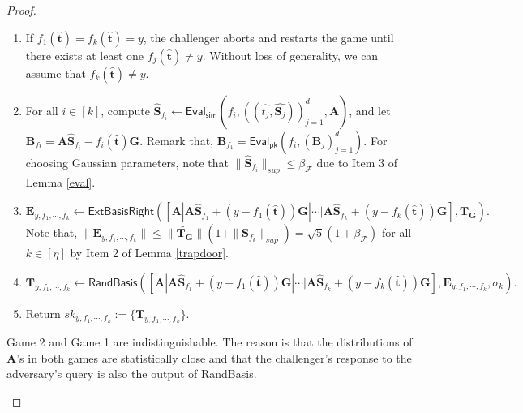 \documentclass[runningheads,10pt]{llncs}
\begin{document}
\begin{proof}
\begin{description}
		\begin{enumerate}
			\item If $f_1(\widehat{\mathbf{t}})=f_k(\widehat{\mathbf{t}})=y$, the challenger aborts and restarts the game until there exists at least one $f_j(\widehat{\mathbf{t}})\neq y$.  Without loss of generality, we can assume that $f_k(\widehat{\mathbf{t}})\neq y$.
			\item For all $i\in [k]$, compute
			$\widehat{\textbf{S}}_{f_i}\leftarrow \textsf{Eval}_\textsf{sim}(f_{i}, ((\widehat{t_j},\widehat{\textbf{S}_j}))_{j=1}^d , \textbf{A})$, and let  $\textbf{B}_{f{i}}=\textbf{A}\widehat{\textbf{S}}_{f_i}-f_{i}(\widehat{\mathbf{t}})\textbf{G}$. Remark that, $\textbf{B}_{f_{1}}=\textsf{Eval}_\textsf{pk}(f_{i}, (\textbf{B}_j)_{j=1}^d)$. For choosing Gaussian parameters, note that  $\|\widehat{\textbf{S}}_{f_i}\|_{sup} \leq \beta_{\mathcal{F}}$ due to Item 3 of Lemma \ref{eval}.
			\item $\textbf{E}_{y,f_1, \cdots, f_k} \leftarrow \textsf{ExtBasisRight}([\textbf{A}|\textbf{A}\widehat{\textbf{S}}_{f_1}+(y-f_1(\widehat{\mathbf{t}}))\textbf{G}|\cdots |\textbf{A}\widehat{\textbf{S}}_{f_k}+(y-f_k(\widehat{\mathbf{t}}))\textbf{G}], \textbf{T}_{\textbf{G}}).$ Note that,  $\| \textbf{E}_{y,f_1, \cdots, f_k}\| \leq \| \widetilde{\mathbf{T}_\mathbf{G}}\|(1+\|\mathbf{S}_{f_k}\|_{sup})=\sqrt{5}(1+\beta_{\mathcal{F}})$ for all $k \in [\eta]$ by Item 2 of Lemma \ref{trapdoor}. 
			\item $\textbf{T}_{y,f_1, \cdots, f_k} \leftarrow \textsf{RandBasis}([\textbf{A}|\textbf{A}\widehat{\textbf{S}}_{f_1}+(y-f_1(\widehat{\mathbf{t}}))\textbf{G}|\cdots |\textbf{A}\widehat{\textbf{S}}_{f_k}+(y-f_k(\widehat{\mathbf{t}}))\textbf{G}], \textbf{E}_{y,f_1, \cdots, f_k} , \sigma_k).$  
			\item Return $sk_{y,f_1, \cdots, f_k}:=\{\textbf{T}_{y, f_1, \cdots, f_k} \}$.
		\end{enumerate}			
		Game 2 and Game 1 are indistinguishable. The reason is that the distributions of $\textbf{A}$'s in both games are statistically close and that the challenger's response to the adversary's query is also the output of \textsf{RandBasis}.
		

\end{description}
\end{proof}
\end{document}
